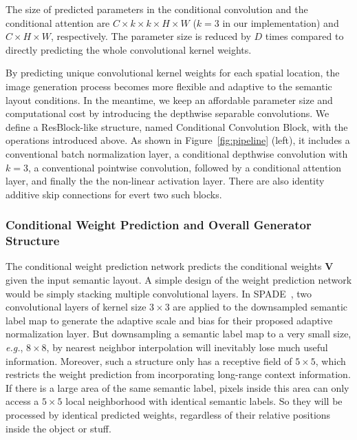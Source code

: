 \documentclass{article}
\newcommand{\eg}{\textit{e.g.}}
\begin{document}
The size of predicted parameters in the conditional convolution and the conditional attention are $C\times k\times k\times H\times W$ ($k=3$ in our implementation) and $C\times H\times W$, respectively.
The parameter size is reduced by $D$ times compared to directly predicting the whole convolutional kernel weights.



By predicting unique convolutional kernel weights for each spatial location, the image generation process becomes more flexible and adaptive to the semantic layout conditions.
In the meantime, we keep an affordable parameter size and computational cost by introducing the depthwise separable convolutions.
We define a ResBlock-like structure, named Conditional Convolution Block, with the operations introduced above. 
As shown in Figure~\ref{fig:pipeline} (left), it includes a conventional batch normalization layer, a conditional depthwise convolution with $k=3$, a conventional pointwise convolution, followed by a conditional attention layer, and finally the the non-linear activation layer. There are also identity additive skip connections for evert two such blocks. 






\subsubsection{Conditional Weight Prediction and Overall Generator Structure}
The conditional weight prediction network predicts the conditional weights $\mathbf{V}$ given the input semantic layout.
A simple design of the weight prediction network would be simply stacking multiple convolutional layers.
In SPADE~\cite{park2019semantic}, two convolutional layers of kernel size $3\times3$ are applied to the downsampled semantic label map to generate the adaptive scale and bias for their proposed adaptive normalization layer.
But downsampling a semantic label map to a very small size, \eg, $8\times8$, by nearest neighbor interpolation will inevitably lose much useful information.
Moreover, such a structure only has a receptive field of $5\times5$, which restricts the weight prediction from incorporating long-range context information.
If there is a large area of the same semantic label, pixels inside this area can only access a $5\times 5$ local neighborhood with identical semantic labels.
So they will be processed by identical predicted weights, regardless of their relative positions inside the object or stuff.
\end{document}
